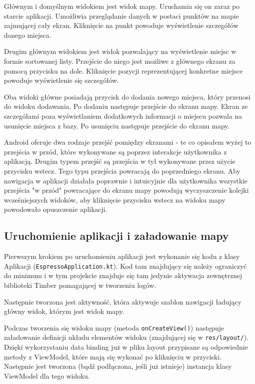\documentclass[polish,polish,a4paper,12pt]{article}
\begin{document}
		Głównym i domyślnym widokiem jest widok mapy. Uruchamia się on zaraz po starcie aplikacji. Umożliwia przeglądanie danych w postaci punktów na mapie zajmującej cały ekran. Kliknięcie na punkt powoduje wyświetlenie szczegółów danego miejsca.

		Drugim głównym widokiem jest widok pozwalający na wyświetlenie miejsc w formie sortowanej listy. Przejście do niego jest możliwe z głównego ekranu za pomocą przycisku na dole. Kliknięcie pozycji reprezentującej konkretne miejsce powoduje wyświetlenie się szczegółów.

		Oba widoki główne posiadają przycisk do dodania nowego miejsca, który przenosi do widoku dodawania. Po dodaniu następuje przejście do ekranu mapy. Ekran ze szczegółami poza wyświetlaniem dodatkowych informacji o miejscu pozwala na usunięcie miejsca z bazy. Po usunięciu następuje przejście do ekranu mapy.

		Android oferuje dwa rodzaje przejść pomiędzy ekranami - te co opisałem wyżej to przejścia w przód, które wykonywane są poprzez interakcje użytkownika z aplikacją. Drugim typem przejść są przejścia w tył wykonywane przez użycie przycisku wstecz. Tego typu przejścia powracają do poprzedniego ekranu. Aby nawigacja w aplikacji działała poprawnie i intuicyjnie dla użytkownika wszystkie przejścia "w przód" powracające do ekranu mapy powodują wyczyszczenie kolejki wcześniejszych widoków, aby kliknięcie przycisku wstecz na widoku mapy powodowało opuszczenie aplikacji.

	\subsection{Uruchomienie aplikacji i załadowanie mapy}

	Pierwszym krokiem po uruchomieniu aplikacji jest wykonanie się kodu z klasy Aplikacji (\texttt{EspressoApplication.kt}). Kod tam znajdujący się należy ograniczyć do minimum i w tym projekcie znajduje się tam jedynie aktywacja zewnętrznej biblioteki Timber pomagającej w tworzeniu logów.

	Następnie tworzona jest aktywność, która aktywuje szablon nawigacji ładujący główny widok, którym jest widok mapy.

	Podczas tworzenia się widoku mapy (metoda \texttt{onCreateView()}) następuje załadowanie definicji układu elementów widoku (znajdującej się w \texttt{res/layout/}). Dzięki wykorzystaniu data binding już w pliku layout przypisane są odpowiednie metody z ViewModel, które mają się wykonać po kliknięciu w przyciski. Następnie jest tworzona (bądź podłączona, jeśli już istnieje) instancja klasy ViewModel dla tego widoku.
\end{document}
